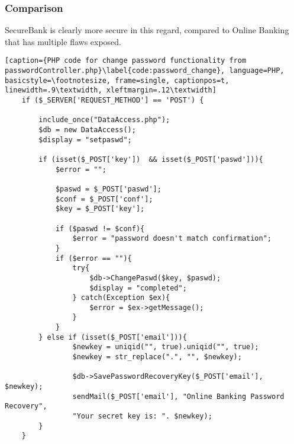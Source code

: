 \subsubsection{Comparison}
SecureBank is clearly more secure in this regard, compared to Online Banking that has multiple flaws exposed.

\begin{lstlisting}[caption={PHP code for change password functionality from passwordController.php}\label{code:password_change}, language=PHP, basicstyle=\footnotesize, frame=single, captionpos=t, linewidth=.9\textwidth, xleftmargin=.12\textwidth]
    if ($_SERVER['REQUEST_METHOD'] == 'POST') {

        include_once("DataAccess.php");
        $db = new DataAccess();
        $display = "setpaswd";

        if (isset($_POST['key'])  && isset($_POST['paswd'])){
            $error = "";

            $paswd = $_POST['paswd'];
            $conf = $_POST['conf'];
            $key = $_POST['key'];

            if ($paswd != $conf){
                $error = "password doesn't match confirmation";
            }
            if ($error == ""){
                try{
                    $db->ChangePaswd($key, $paswd);
                    $display = "completed";
                } catch(Exception $ex){
                    $error = $ex->getMessage();
                }
            }
        } else if (isset($_POST['email'])){
                $newkey = uniqid("", true).uniqid("", true);
                $newkey = str_replace(".", "", $newkey);

                $db->SavePasswordRecoveryKey($_POST['email'], $newkey);
                sendMail($_POST['email'], "Online Banking Password Recovery",
                "Your secret key is: ". $newkey);
        }
    }
\end{lstlisting}

\clearpage